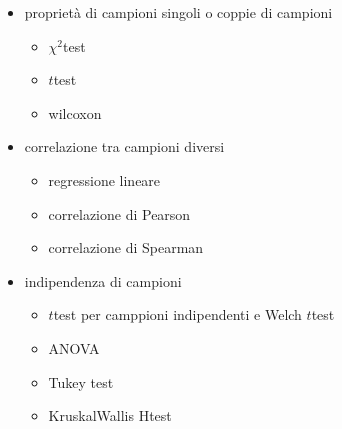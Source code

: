 \documentclass[letterpaper,10pt,italian]{jupyterBook}
\begin{document}
\sphinxAtStartPar
{}
\begin{itemize}
\item {} 
\sphinxAtStartPar
proprietà di campioni singoli o coppie di campioni
\begin{itemize}
\item {} 
\sphinxAtStartPar
\(\chi^2\)\sphinxhyphen{}test

\item {} 
\sphinxAtStartPar
\(t\)\sphinxhyphen{}test

\item {} 
\sphinxAtStartPar
wilcoxon

\end{itemize}

\item {} 
\sphinxAtStartPar
correlazione tra campioni diversi
\begin{itemize}
\item {} 
\sphinxAtStartPar
regressione lineare

\item {} 
\sphinxAtStartPar
correlazione di Pearson

\item {} 
\sphinxAtStartPar
correlazione di Spearman

\end{itemize}

\item {} 
\sphinxAtStartPar
indipendenza di campioni
\begin{itemize}
\item {} 
\sphinxAtStartPar
\(t\)\sphinxhyphen{}test per camppioni indipendenti e Welch \(t\)\sphinxhyphen{}test

\item {} 
\sphinxAtStartPar
ANOVA

\item {} 
\sphinxAtStartPar
Tukey test

\item {} 
\sphinxAtStartPar
Kruskal\sphinxhyphen{}Wallis H\sphinxhyphen{}test

\end{itemize}

\end{itemize}



\sphinxstepscope
\end{document}
